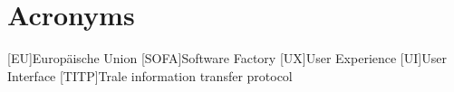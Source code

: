 \chapter{Acronyms}\label{ch:acronyms}
\begin{acronym}
    [EU]{Europäische Union}
    [SOFA]{Software Factory}
    [UX]{User Experience}
    [UI]{User Interface}
    [TITP]{Trale information transfer protocol}
\end{acronym}
